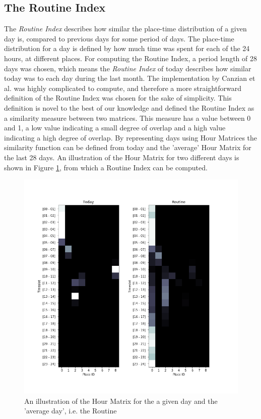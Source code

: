\subsection{The Routine Index}
The \textit{Routine Index} describes how similar the place-time distribution of a given day is, compared to previous days for some period of days. The place-time distribution for a day is defined by how much time was spent for each of the 24 hours, at different places. For computing the Routine Index, a period length of 28 days was chosen, which means the \textit{Routine Index} of today describes how similar today was to each day during the last month. The implementation by Canzian et al. \cite{Canzian2015} was highly complicated to compute, and therefore a more straightforward definition of the Routine Index was chosen for the sake of simplicity. This definition is novel to the best of our knowledge and defined the Routine Index as a similarity measure between two matrices. This measure has a value between 0 and 1, a low value indicating a small degree of overlap and a high value indicating a high degree of overlap. By representing days using Hour Matrices the similarity function can be defined from today and the 'average' Hour Matrix for the last 28 days. An illustration of the Hour Matrix for two different days is shown in Figure \ref{fig:routine-matrix}, from which a Routine Index can be computed.

\begin{figure}
    \centering
    \includegraphics[width=\textwidth]{images/routine.png}
    \caption{An illustration of the Hour Matrix for the a given day and the 'average day', i.e. the Routine}
    \label{fig:routine-matrix}
\end{figure}

